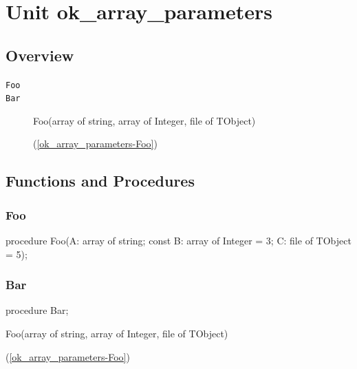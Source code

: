 \documentclass{report}
\begin{document}
\newlength{\tmplength}
\chapter{Unit ok{\_}array{\_}parameters}
\section{Overview}
\begin{description}
\item[\texttt{Foo}]
\item[\texttt{Bar}]\begin{ttfamily}Foo(array of string, array of Integer, file of TObject)\end{ttfamily}(\ref{ok_array_parameters-Foo})
\end{description}
\section{Functions and Procedures}
\subsection*{Foo}
\begin{list}{}{
\setlength{\itemindent}{0cm}
\setlength{\listparindent}{0cm}
\setlength{\leftmargin}{\evensidemargin}
\addtolength{\leftmargin}{\tmplength}
\settowidth{\labelsep}{X}
\addtolength{\leftmargin}{\labelsep}
\setlength{\labelwidth}{\tmplength}
}
\begin{flushleft}
\item[\textbf{Declaration}\hfill]
\begin{ttfamily}
procedure Foo(A: array of string; const B: array of Integer = 3; C: file of TObject = 5);\end{ttfamily}


\end{flushleft}
\end{list}
\subsection*{Bar}
\begin{list}{}{
\setlength{\itemindent}{0cm}
\setlength{\listparindent}{0cm}
\setlength{\leftmargin}{\evensidemargin}
\addtolength{\leftmargin}{\tmplength}
\settowidth{\labelsep}{X}
\addtolength{\leftmargin}{\labelsep}
\setlength{\labelwidth}{\tmplength}
}
\begin{flushleft}
\item[\textbf{Declaration}\hfill]
\begin{ttfamily}
procedure Bar;\end{ttfamily}


\end{flushleft}
\par
\item[\textbf{Description}]
\begin{ttfamily}Foo(array of string, array of Integer, file of TObject)\end{ttfamily}(\ref{ok_array_parameters-Foo})

\end{list}
\end{document}

